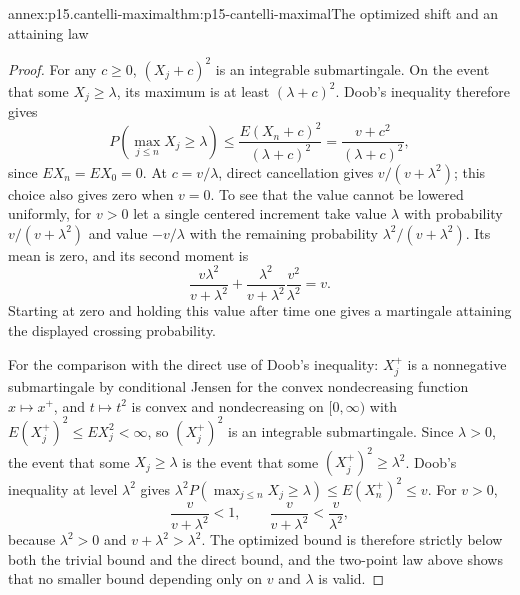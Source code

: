 \begin{annexitem}{annex:p15.cantelli-maximal}{thm:p15-cantelli-maximal}{The optimized shift and an attaining law}
\begin{proof}
For any \(c\geq0\), \((X_j+c)^2\) is an integrable submartingale.
On the event that some \(X_j\geq\lambda\), its maximum is at least
\((\lambda+c)^2\). Doob's inequality therefore gives
\[
 P(\max_{j\leq n}X_j\geq\lambda)
          \leq\frac{E(X_n+c)^2}{(\lambda+c)^2}
          =\frac{v+c^2}{(\lambda+c)^2},
\]
since \(EX_n=EX_0=0\).
At \(c=v/\lambda\), direct cancellation gives
\(v/(v+\lambda^2)\); this choice also gives zero when \(v=0\).
To see that the value cannot be lowered uniformly, for \(v>0\)
let a single centered increment take value \(\lambda\) with
probability \(v/(v+\lambda^2)\) and value \(-v/\lambda\)
with the remaining probability \(\lambda^2/(v+\lambda^2)\).
Its mean is zero, and its second moment is
\[
 \frac{v\lambda^2}{v+\lambda^2}
        +\frac{\lambda^2}{v+\lambda^2}\frac{v^2}{\lambda^2}=v.
\]
Starting at zero and holding this value after time one gives
a martingale attaining the displayed crossing probability.

For the comparison with the direct use of Doob's inequality: \(X_j^+\)
is a nonnegative submartingale by conditional Jensen for the convex
nondecreasing function \(x\mapsto x^+\), and \(t\mapsto t^2\) is convex
and nondecreasing on \([0,\infty)\) with
\(E(X_j^+)^2\leq EX_j^2<\infty\), so \((X_j^+)^2\) is an integrable
submartingale. Since \(\lambda>0\), the event that some \(X_j\geq\lambda\)
is the event that some \((X_j^+)^2\geq\lambda^2\). Doob's inequality at
level \(\lambda^2\) gives
\(\lambda^2P(\max_{j\leq n}X_j\geq\lambda)\leq E(X_n^+)^2\leq v\).
For \(v>0\),
\[
 \frac v{v+\lambda^2}<1,\qquad
 \frac v{v+\lambda^2}<\frac v{\lambda^2},
\]
because \(\lambda^2>0\) and \(v+\lambda^2>\lambda^2\). The optimized
bound is therefore strictly below both the trivial bound and the direct
bound, and the two-point law above shows that no smaller bound depending
only on \(v\) and \(\lambda\) is valid.
\end{proof}
\end{annexitem}

